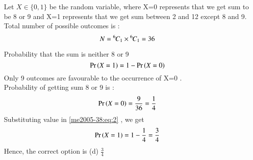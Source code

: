 
Let $X \in \{0,1\}$ be the random variable, where X=0 represents that we get sum to be 8 or 9 and X=1 represents that we get sum between 2 and 12 except 8 and 9.\\
Total number of possible outcomes is :
\begin{equation}
    N = {{{}^{6}\mkern-1muC_{1}}}\times{{{}^{6}\mkern-1muC_{1}}} = 36
\end{equation}
 
Probability that the sum is neither 8 or 9 
\begin{equation}\label{me2005-38:eq:2}
  \pr{X=1} = 1-\pr{X=0}
\end{equation}
 Only 9 outcomes are favourable to the occurrence of X=0 .\\
Probability of getting sum 8 or 9 is :
\begin{equation}
    \Pr\left(X=0\right) = \frac{9}{36}
             = \frac{1}{4}
\end{equation}
Substituting value in \eqref{me2005-38:eq:2} , we get
\begin{equation}
 \Pr\left(X=1\right) = 1- \frac{1}{4}
          = \frac{3}{4}   
\end{equation}
Hence, the correct option is (d) \large$\frac{3}{4}$